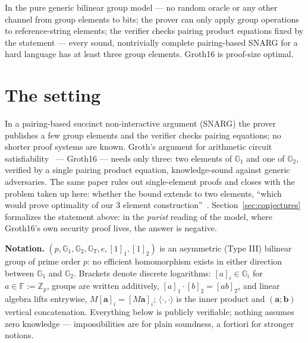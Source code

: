 \documentclass{aicr-conjecture}
\newcommand{\Gone}{\mathbb{G}_1}
\newcommand{\Gtwo}{\mathbb{G}_2}
\newcommand{\GTt}{\mathbb{G}_T}
\newcommand{\FF}{\mathbb{F}}
\begin{document}

\vspace{0.4em}

\begin{informalconjecture}
In the pure generic bilinear group model --- no random
oracle or any other channel from group elements to bits; the prover
can only apply group operations to reference-string elements; the
verifier checks pairing product equations fixed by the statement ---
every sound, nontrivially complete pairing-based SNARG for a hard
language has at least three group elements.  Groth16 is proof-size
optimal.
\end{informalconjecture}

\section{The setting}\label{sec:setting}

In a pairing-based succinct non-interactive argument (SNARG) the
prover publishes a few group elements and the verifier checks
pairing equations; no shorter proof systems are known.
Groth's argument for arithmetic circuit satisfiability~\cite{Gro16}
--- Groth16 --- needs only three: two elements of $\Gone$ and one of
$\Gtwo$, verified by a single pairing product equation,
knowledge-sound against generic adversaries.  The same paper rules
out single-element proofs and closes with the problem taken up here:
whether the bound extends to two elements, ``which would prove
optimality of our 3 element construction''~\cite{Gro16}.
Section~\ref{sec:conjectures} formalizes the statement above: in the
\emph{purist} reading of the model, where Groth16's own security
proof lives, the answer is negative.

\smallskip
\noindent\textbf{Notation.}
$(p,\Gone,\Gtwo,\GTt,e,[1]_1,[1]_2)$ is an asymmetric (Type III)
bilinear group of prime order $p$: no efficient homomorphism exists
in either direction between $\Gone$ and $\Gtwo$.  Brackets denote
discrete logarithms: $[a]_i \in \mathbb{G}_i$ for
$a \in \FF := \mathbb{Z}_p$, groups are written additively,
$[a]_1 \cdot [b]_2 = [ab]_T$, and linear algebra lifts entrywise,
$M[\boldsymbol{a}]_i = [M\boldsymbol{a}]_i$; $\langle
\cdot,\cdot \rangle$ is the inner product and
$(\boldsymbol{a};\boldsymbol{b})$ vertical concatenation.
Everything below is publicly verifiable; nothing assumes zero
knowledge --- impossibilities are for plain soundness, a fortiori
for stronger notions.
\end{document}
